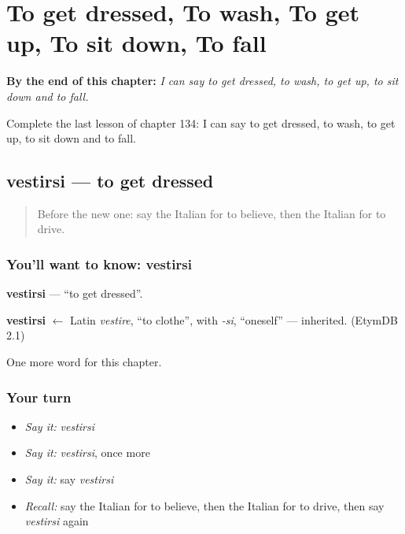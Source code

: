 
\chapter{To get dressed, To wash, To get up, To sit down, To fall}
\label{ch:it-to-get-dressed-to-wash-to-get-up-to-sit-down-to-fall}

\begin{chapteropening}
\textbf{By the end of this chapter:} \emph{I can say to get dressed, to wash, to get up, to sit down and to fall.}

Complete the last lesson of chapter 134: I can say to get dressed, to wash, to get up, to sit down and to fall.
\end{chapteropening}

\section[vestirsi]{vestirsi — to get dressed}

\label{lesson:IT-C134-vestirsi}



\begin{quote}
Before the new one: say the Italian for to believe, then the Italian for to drive.
\end{quote}

\subsection*{You'll want to know: vestirsi}
\textbf{vestirsi} — \textquotedblleft{}to get dressed\textquotedblright{}.

\begin{cousinweb}
\textbf{vestirsi} $\leftarrow$ Latin \emph{vestire}, \textquotedblleft{}to clothe\textquotedblright{}, with \emph{-si}, \textquotedblleft{}oneself\textquotedblright{} — inherited. (EtymDB 2.1)
\end{cousinweb}

\begin{grammarlens}[title={What you've built}]
One more word for this chapter.
\end{grammarlens}

\subsection*{Your turn}
\begin{itemize}
\raggedright
  \item \emph{Say it:} \emph{vestirsi}
  \item \emph{Say it:} \emph{vestirsi}, once more
  \item \emph{Say it:} say \emph{vestirsi}
  \item \emph{Recall:} say the Italian for to believe, then the Italian for to drive, then say \emph{vestirsi} again
\end{itemize}

